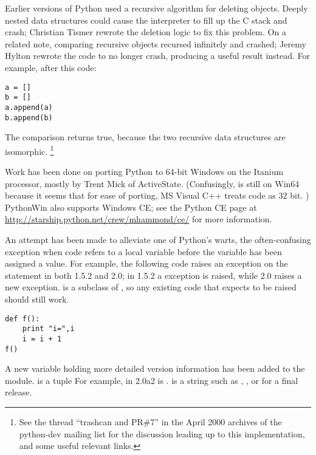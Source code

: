 \documentclass{howto}
\begin{document}
Earlier versions of Python used a recursive algorithm for deleting
objects.  Deeply nested data structures could cause the interpreter to
fill up the C stack and crash; Christian Tismer rewrote the deletion
logic to fix this problem.  On a related note, comparing recursive
objects recursed infinitely and crashed; Jeremy Hylton rewrote the
code to no longer crash, producing a useful result instead.  For
example, after this code:

\begin{verbatim}
a = []
b = []
a.append(a)
b.append(b)
\end{verbatim}

The comparison  returns true, because the two recursive
data structures are isomorphic.
\footnote{See the thread ``trashcan and PR\#7'' in the April 2000 archives of the python-dev mailing list for the discussion leading up to this implementation, and some useful relevant links.
}

Work has been done on porting Python to 64-bit Windows on the Itanium
processor, mostly by Trent Mick of ActiveState.  (Confusingly,  is still  on
Win64 because it seems that for ease of porting, MS Visual C++ treats code
as 32 bit.
)  PythonWin also supports Windows CE; see the Python CE page at
\url{http://starship.python.net/crew/mhammond/ce/} for more information.

An attempt has been made to alleviate one of Python's warts, the
often-confusing  exception when code refers to a
local variable before the variable has been assigned a value.  For
example, the following code raises an exception on the 
statement in both 1.5.2 and 2.0; in 1.5.2 a 
exception is raised, while 2.0 raises a new
 exception.
 is a subclass of ,
so any existing code that expects  to be raised
should still work.

\begin{verbatim}
def f():
    print "i=",i
    i = i + 1 
f()
\end{verbatim}

A new variable holding more detailed version information has been
added to the  module.   is a tuple
 For example, in 2.0a2  is
.   is a string such as
, , or  for a final release.
\end{document}
